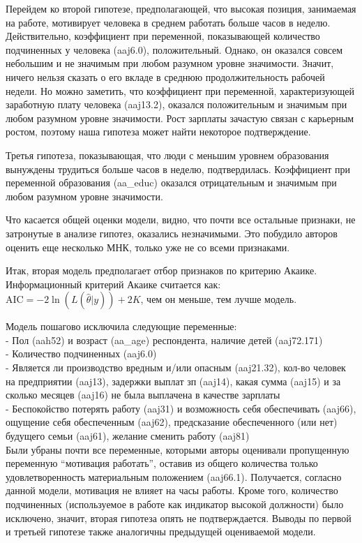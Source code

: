 \documentclass[12pt, a4paper]{article}
\begin{document}
{		Перейдем ко второй гипотезе, предполагающей, что высокая позиция, занимаемая на работе, мотивирует человека в среднем работать больше часов в неделю. Действительно, коэффициент при переменной, показывающей количество подчиненных у человека (aaj6.0), положительный. Однако, он оказался совсем небольшим и не значимым при любом разумном уровне значимости. Значит, ничего нельзя сказать о его вкладе в среднюю продолжительность рабочей недели. Но можно заметить, что коэффициент при переменной, характеризующей заработную плату человека (aaj13.2), оказался положительным и значимым при любом разумном уровне значимости. Рост зарплаты зачастую связан с карьерным ростом, поэтому наша гипотеза может найти некоторое подтверждение. 
		
		Третья гипотеза, показывающая, что люди с меньшим уровнем образования вынуждены трудиться больше часов в неделю, подтвердилась. Коэффициент при переменной образования (aa\_educ) оказался отрицательным и значимым при любом разумном уровне значимости.
		
		Что касается общей оценки модели, видно, что почти все остальные признаки, не затронутые в анализе гипотез, оказались незначимыми. Это побудило авторов оценить еще несколько МНК, только уже не со всеми признаками. 
		
		
		Итак, вторая модель предполагает отбор признаков по критерию Акаике. Информационный критерий Акаике считается как: $\text{AIC}=-2 \ln{(L(\hat{\theta}|y))} + 2K$, чем он меньше, тем лучше модель. 
		
		Модель пошагово исключила следующие переменные: \\
		-   Пол (aah52) и возраст (aa\_age) респондента, наличие детей (aaj72.171) \\
		-   Количество подчиненных (aaj6.0) \\
		-   Является ли производство вредным и/или опасным (aaj21.32), кол-во человек на предприятии (aaj13), задержки выплат зп (aaj14), какая сумма (aaj15) и за сколько месяцев (aaj16) не была выплачена в качестве зарплаты \\
		-   Беспокойство потерять работу (aaj31) и возможность себя обеспечивать (aaj66), ощущение себя обеспеченным (aaj62), предсказание обеспеченного (или нет) будущего семьи (aaj61), желание сменить работу (aaj81) \\
		
		Были убраны почти все переменные, которыми авторы оценивали пропущенную переменную “мотивация работать”, оставив из общего количества только удовлетворенность материальным положением (aaj66.1). Получается, согласно данной модели, мотивация не влияет на часы работы. Кроме того, количество подчиненных (используемое в работе как индикатор высокой должности) было исключено, значит, вторая гипотеза опять не подтверждается. Выводы по первой и третьей гипотезе также аналогичны предыдущей оцениваемой модели. 
		
}
\end{document}
